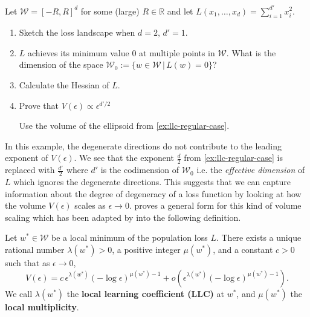 \documentclass[11pt]{article}
\newcommand{\R}{\mathbb{R}}
\newcommand{\W}{\mathcal{W}}
\begin{document}
\begin{exercise}
    \label{ex:quad-valley-scaling}
    Let $\W = [-R,R]^d$ for some (large) $R\in\R$ and let $L(x_1,\dots,x_d) = \sum\limits_{i=1}^{d'}x_i^2$.
    \begin{enumerate}
        \item Sketch the loss landscape when $d=2, \,d'=1$.
        \item $L$ achieves its minimum value $0$ at multiple points in $\W$. What is the dimension of the space $\W_0 :=  \{w\in\W \, | \,L(w)=0\}$? 
        \item Calculate the Hessian of $L$.
        \item Prove that $V(\epsilon) \propto \epsilon^{d'/2}$
        
        \begin{hint}
Use the volume of the ellipsoid from \cref{ex:llc-regular-case}.
        \end{hint}
    \end{enumerate}
\end{exercise}

In this example, the degenerate directions do not contribute to the leading exponent of $V(\epsilon)$. We see that the exponent $\frac{d}{2}$ from \cref{ex:llc-regular-case} is replaced with $\frac{d'}{2}$ where $d'$ is the codimension of $\W_0$ i.e. the \textit{effective dimension} of $L$ which ignores the degenerate directions. This suggests that we can capture information about the degree of degeneracy of a loss function by looking at how the volume $V(\epsilon)$ scales as $\epsilon \to 0$. \cite{Watanabe2009} proves a general form for this kind of volume scaling which has been adapted by \cite{Lau+2025} into the following definition.

\begin{definition}
\label{def:llc}
    Let $w^* \in \W$ be a local minimum of the population loss $L$. There exists a unique rational number $\lambda(w^*) > 0$, a positive integer $\mu(w^*)$, and a constant $c > 0$ such that as $\epsilon \to 0$,
    \begin{equation}
    \label{eq:llc-volume}
        V(\epsilon) = c \, \epsilon^{\lambda(w^*)} (-\log \epsilon)^{\mu(w^*)-1} + o\!\left(\epsilon^{\lambda(w^*)} (-\log \epsilon)^{\mu(w^*)-1}\right).
    \end{equation}
    We call $\lambda(w^*)$ the \textbf{local learning coefficient (LLC)} at $w^*$, and $\mu(w^*)$ the \textbf{local multiplicity}.
\end{definition}
\end{document}

